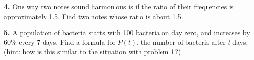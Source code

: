\documentclass[letterpaper, 12pt]{article}
\begin{document}
\vfill
\textbf{4.} One way two notes sound harmonious is if the ratio of their frequencies is approximately 1.5. Find two notes whose ratio is about 1.5.

\vfill
\textbf{5.} A population of bacteria starts with 100 bacteria on day zero, and increases by 60\% every 7 days. Find a formula for $P(t)$, the number of bacteria after $t$ days. (hint: how is this similar to the situation with problem \textbf{1}?)

\vfill
\end{document}
